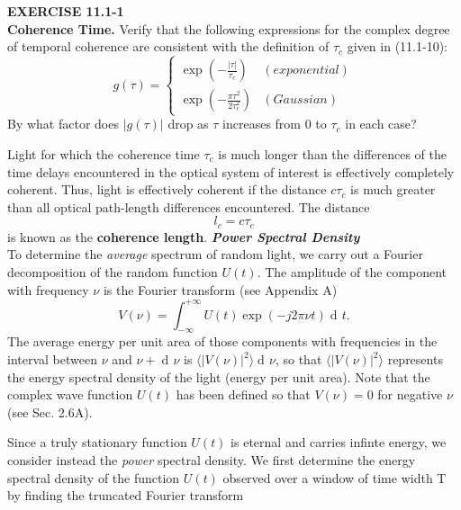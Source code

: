 \documentclass{article}
\newcommand\crule[3][black]{\textcolor{#1}{\rule{#2}{#3}}}
\numberwithin{figure}{subsection}
\numberwithin{table}{subsection}
\DeclareMathOperator\dif{d\!}
\begin{document}
\bigbreak\noindent{\crule[ksc]{\textwidth}{0.2cm}}
\textbf{EXERCISE 11.1-1} \\
\textbf{Coherence Time.} Verify that the following expressions for the complex degree of temporal coherence are consistent with the definition of $ \tau_c $ given in (11.1-10):
\begin{equation}
g(\tau) = 
\begin{cases}
\exp(-\frac{\lvert \tau \rvert}{\tau_c}) & (exponential) \\
\exp(-\frac{\pi \tau^2}{2\tau_c^2}) & (Gaussian)
\end{cases}
\end{equation}
By what factor does $ \lvert g(\tau) \rvert $ drop as $ \tau $ increases from 0 to $ \tau_c $ in each case? \\
\noindent{\crule[ksc]{\textwidth}{0.2cm}}
\par Light for which the coherence time $ \tau_c $ is much longer than the differences of the time delays encountered in the optical system of interest is effectively completely coherent. Thus, light is effectively coherent if the distance $c\tau_c$ is much greater than all optical path-length differences encountered. The distance
\begin{equation}
l_c = c\tau_c
\end{equation}
is known as the \textbf{coherence length}.
\bigbreak\noindent\textcolor{ksc}{\textbf{\textsl{Power Spectral Density}}}\\
To determine the \textsl{average} spectrum of random light, we carry out a Fourier decomposition of the random function $ U(t) $. The amplitude of the component with frequency $ \nu $ is the Fourier transform (see Appendix A)
\begin{equation}
V(\nu) = \int_{-\infty}^{+\infty} U(t) \exp(-j2 \pi \nu t) \dif t .
\end{equation}
The average energy per unit area of those components with frequencies in the interval between $ \nu $ and $ \nu +\dif \nu $ is $ \langle \lvert V(\nu) \rvert ^2 \rangle \dif \nu $, so that  $ \langle \lvert V(\nu) \rvert ^2 \rangle $ represents the energy spectral density of the light (energy per unit area). Note that the complex wave function $ U(t) $ has been defined so that $ V(\nu) = 0 $ for negative $ \nu $ (see Sec. 2.6A).
\par Since a truly stationary function $ U(t) $ is eternal and carries infinte energy, we consider instead the \textsl{power} spectral density. We first determine the energy spectral density of the function $ U(t) $ observed over a window of time width T by finding the truncated Fourier transform
\end{document}
